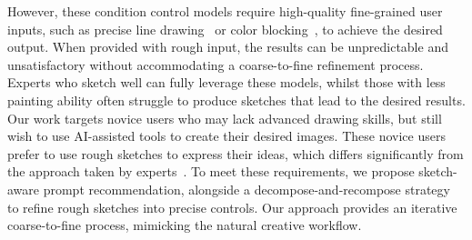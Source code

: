 However, these condition control models require high-quality fine-grained user inputs, such as precise line drawing~\cite{zhang2023adding} or color blocking~\cite{rombach2022high}, to achieve the desired output.
When provided with rough input, the results can be unpredictable and unsatisfactory without accommodating a coarse-to-fine refinement process.
Experts who sketch well can fully leverage these models, whilst those with less painting ability often struggle to produce sketches that lead to the desired results.
Our work targets novice users who may lack advanced drawing skills, but still wish to use AI-assisted tools to create their desired images.
These novice users prefer to use rough sketches to express their ideas, which differs significantly from the approach taken by experts~\cite{shi2023understanding}.
To meet these requirements, we propose sketch-aware prompt recommendation, alongside a decompose-and-recompose strategy to refine rough sketches into precise controls.
Our approach provides an iterative coarse-to-fine process, mimicking the natural creative workflow.


